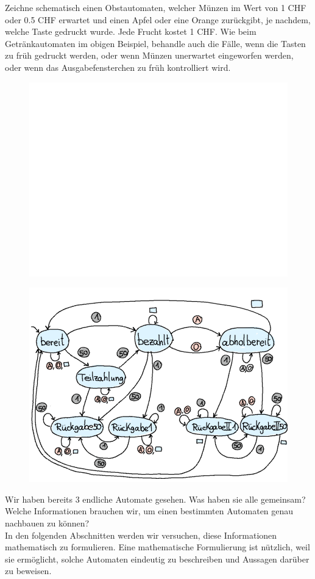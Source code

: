 \documentclass{article}
\begin{document}
\begin{question}
Zeichne schematisch einen Obstautomaten, welcher Münzen im Wert von 1 CHF oder 0.5 CHF erwartet und einen Apfel oder eine Orange zurückgibt, je nachdem, welche Taste gedruckt wurde. Jede Frucht kostet 1 CHF. Wie beim Getränkautomaten im obigen Beispiel, behandle auch die Fälle, wenn die Tasten zu früh gedruckt werden, oder wenn Münzen unerwartet eingeworfen werden, oder wenn das Ausgabefensterchen zu früh kontrolliert wird.
\begin{figure}[H]
\centering
\includegraphics[width=0.6\linewidth]{Pictures/weiss.png} 
\end{figure}
\end{question}
\begin{questionsolution}
\begin{figure}[H]
\centering
\includegraphics[width=0.6\linewidth]{Pictures/Obstautomat.png} 
\end{figure}
\end{questionsolution}

Wir haben bereits 3 endliche Automate gesehen. Was haben sie alle gemeinsam? Welche Informationen brauchen wir, um einen bestimmten Automaten genau nachbauen zu können?\\


In den folgenden Abschnitten werden wir versuchen, diese Informationen mathematisch zu formulieren. Eine mathematische Formulierung ist nützlich, weil sie ermöglicht, solche Automaten eindeutig zu beschreiben und Aussagen darüber zu beweisen.
\end{document}
